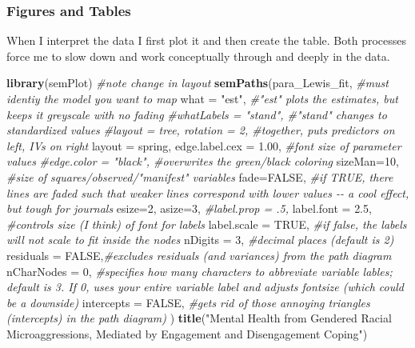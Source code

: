 \documentclass[
  11pt,
]{book}
\newenvironment{Shaded}{\begin{snugshade}}{\end{snugshade}}
\newcommand{\AttributeTok}[1]{\textcolor[rgb]{0.27,0.27,0.27}{#1}}
\newcommand{\CommentTok}[1]{\textcolor[rgb]{0.37,0.37,0.37}{\textit{#1}}}
\newcommand{\ConstantTok}[1]{\textcolor[rgb]{0.37,0.37,0.37}{#1}}
\newcommand{\DecValTok}[1]{\textcolor[rgb]{0.06,0.06,0.06}{#1}}
\newcommand{\FloatTok}[1]{\textcolor[rgb]{0.06,0.06,0.06}{#1}}
\newcommand{\FunctionTok}[1]{\textcolor[rgb]{0.27,0.27,0.27}{\textbf{#1}}}
\newcommand{\NormalTok}[1]{#1}
\newcommand{\StringTok}[1]{\textcolor[rgb]{0.5,0.5,0.5}{#1}}
\begin{document}
\hypertarget{figures-and-tables-1}{%
\subsubsection{Figures and Tables}\label{figures-and-tables-1}}

When I interpret the data I first plot it and then create the table. Both processes force me to slow down and work conceptually through and deeply in the data.

\begin{Shaded}
\begin{Highlighting}[]
\FunctionTok{library}\NormalTok{(semPlot)}
\CommentTok{\#note change in layout }
\FunctionTok{semPaths}\NormalTok{(para\_Lewis\_fit, }\CommentTok{\#must identiy the model you want to map}
         \AttributeTok{what =} \StringTok{"est"}\NormalTok{, }\CommentTok{\#"est" plots the estimates, but keeps it greyscale with no fading}
         \CommentTok{\#whatLabels = "stand", \#"stand" changes to standardized values}
         \CommentTok{\#layout = \textquotesingle{}tree\textquotesingle{}, rotation = 2, \#together, puts predictors on left, IVs on right }
         \AttributeTok{layout =} \StringTok{\textquotesingle{}spring\textquotesingle{}}\NormalTok{, }
         \AttributeTok{edge.label.cex =} \FloatTok{1.00}\NormalTok{, }\CommentTok{\#font size of parameter values}
         \CommentTok{\#edge.color = "black", \#overwrites the green/black coloring}
         \AttributeTok{sizeMan=}\DecValTok{10}\NormalTok{, }\CommentTok{\#size of squares/observed/"manifest" variables}
         \AttributeTok{fade=}\ConstantTok{FALSE}\NormalTok{, }\CommentTok{\#if TRUE, there lines are faded such that weaker lines correspond with lower values {-}{-} a cool effect, but tough for journals}
         \AttributeTok{esize=}\DecValTok{2}\NormalTok{, }
         \AttributeTok{asize=}\DecValTok{3}\NormalTok{,}
         \CommentTok{\#label.prop = .5,}
         \AttributeTok{label.font =} \FloatTok{2.5}\NormalTok{, }\CommentTok{\#controls size (I think) of font for labels}
         \AttributeTok{label.scale =} \ConstantTok{TRUE}\NormalTok{, }\CommentTok{\#if false, the labels will not scale to fit inside the nodes}
         \AttributeTok{nDigits =} \DecValTok{3}\NormalTok{, }\CommentTok{\#decimal places (default is 2)}
         \AttributeTok{residuals =} \ConstantTok{FALSE}\NormalTok{,}\CommentTok{\#excludes residuals (and variances) from the path diagram}
         \AttributeTok{nCharNodes =} \DecValTok{0}\NormalTok{, }\CommentTok{\#specifies how many characters to abbreviate variable lables; default is 3.  If 0, uses your entire variable label and adjusts fontsize (which could be a downside)}
         \AttributeTok{intercepts =} \ConstantTok{FALSE}\NormalTok{, }\CommentTok{\#gets rid of those annoying triangles (intercepts) in the path diagram)}
\NormalTok{)}
\FunctionTok{title}\NormalTok{(}\StringTok{"Mental Health from Gendered Racial Microaggressions, Mediated by Engagement and Disengagement Coping"}\NormalTok{)}
\end{Highlighting}
\end{Shaded}
\end{document}

